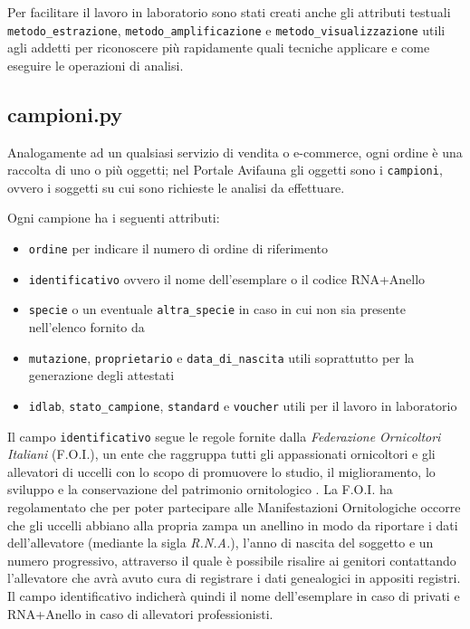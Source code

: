 Per facilitare il lavoro in laboratorio sono stati creati anche gli attributi testuali \texttt{metodo\_estrazione},  \texttt{metodo\_amplificazione} e \texttt{metodo\_visualizzazione} utili agli addetti per riconoscere più rapidamente quali tecniche applicare e come eseguire le operazioni di analisi.

\subsection*{campioni.py}
\label{subs:campioni}
Analogamente ad un qualsiasi servizio di vendita o e-commerce, ogni ordine è una raccolta di uno o più oggetti; nel Portale Avifauna gli oggetti sono i \texttt{campioni}, ovvero i soggetti su cui sono richieste le analisi da effettuare.

Ogni campione ha i seguenti attributi:
\begin{itemize}
 \item \texttt{ordine} per indicare il numero di ordine di riferimento
 \item \texttt{identificativo} ovvero il nome dell'esemplare o il codice RNA+Anello
 \item \texttt{specie} o un eventuale \texttt{altra\_specie} in caso in cui non sia presente nell'elenco fornito da {\fem}
 \item \texttt{mutazione}, \texttt{proprietario} e \texttt{data\_di\_nascita} utili soprattutto per la generazione degli attestati
 \item \texttt{idlab}, \texttt{stato\_campione}, \texttt{standard} e \texttt{voucher} utili per il lavoro in laboratorio
\end{itemize} 

Il campo \texttt{identificativo} segue le regole fornite dalla \emph{Federazione Ornicoltori Italiani} (F.O.I.), un ente che raggruppa tutti gli appassionati ornicoltori e gli allevatori di uccelli con lo scopo di promuovere lo studio, il miglioramento, lo sviluppo e la conservazione del patrimonio ornitologico \cite{foi}. La F.O.I. ha regolamentato che per poter partecipare alle Manifestazioni Ornitologiche occorre che gli uccelli abbiano alla propria zampa un anellino in modo da riportare i dati dell'allevatore (mediante la sigla \emph{R.N.A.}), l'anno di nascita del soggetto e un numero progressivo, attraverso il quale è possibile risalire ai genitori contattando l'allevatore che avrà avuto cura di registrare i dati genealogici in appositi registri. Il campo identificativo indicherà quindi il nome dell'esemplare in caso di privati e RNA+Anello in caso di allevatori professionisti.

